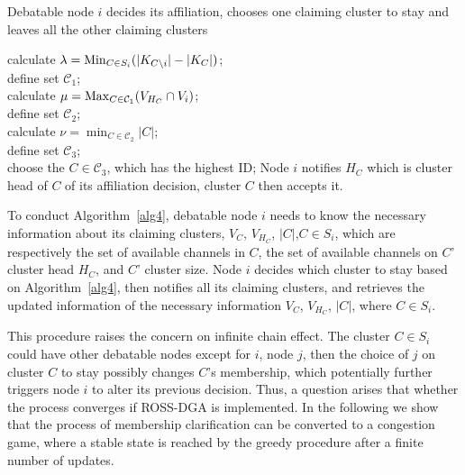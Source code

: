 \begin{algorithm}               %
\caption{Debatable node $i$ decides its affiliation, chooses one claiming cluster to stay and leaves all the other claiming clusters}          %
\label{alg4}
\DontPrintSemicolon
\SetAlgoLined
{}
calculate $\lambda = \operatorname*{Min}_{C\in S_i}(|K_{C\setminus i}|-|K_C|)$;\\
define set $\mathcal{C}_1$;\\	
{
calculate $\mu= \operatorname*{Max}_{C\in \mathcal{C}_1}(V_{H_C}\cap V_i)$;\\
define set $\mathcal{C}_2$;\\	
	{
	calculate $\nu=\min_{C\in \mathcal{C}_2}|C|$;\\
	define set $\mathcal{C}_3$;\\	
		{choose the $C\in \mathcal{C}_3$, which has the highest ID;
		}
	}
}
Node $i$ notifies $H_C$ which is cluster head of $C$ of its affiliation decision, cluster $C$ then accepts it.

\end{algorithm}

To conduct Algorithm~\ref{alg4}, debatable node $i$ needs to know the necessary information about its claiming clusters, \ie $V_C$, $V_{H_C}$, $|C|$,$C\in S_i$, which are respectively the set of available channels in $C$, the set of available channels on $C$' cluster head $H_C$, and $C$' cluster size.
Node $i$ decides which cluster to stay based on Algorithm~\ref{alg4}, then notifies all its claiming clusters, and retrieves the updated information of the necessary information $V_C$, $V_{H_C}$, $|C|$, where $C\in S_i$.

This procedure raises the concern on infinite chain effect.
The cluster $C\in S_i$ could have other debatable nodes except for $i$, \ie node $j$, then the choice of $j$ on cluster $C$ to stay possibly changes $C$'s membership, which potentially further triggers node $i$ to alter its previous decision. 
Thus, a question arises that whether the process converges if ROSS-DGA is implemented.
In the following we show that the process of membership clarification can be converted to a congestion game, where a stable state is reached by the greedy procedure after a finite number of updates.

